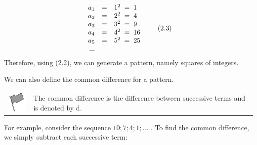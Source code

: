     \begin{equation}
    \begin{array}{ccc}\hfill {a}_{1}& =& {1}^{2}\phantom{\rule{0.277778em}{0ex}}=\phantom{\rule{0.277778em}{0ex}}1\hfill \\ \hfill {a}_{2}& =& {2}^{2}\phantom{\rule{0.277778em}{0ex}}=\phantom{\rule{0.277778em}{0ex}}4\hfill \\ \hfill {a}_{3}& =& {3}^{2}\phantom{\rule{0.277778em}{0ex}}=\phantom{\rule{0.277778em}{0ex}}9\hfill \\ \hfill {a}_{4}& =& {4}^{2}\phantom{\rule{0.277778em}{0ex}}=\phantom{\rule{0.277778em}{0ex}}16\hfill \\ \hfill {a}_{5}& =& {5}^{2}\phantom{\rule{0.277778em}{0ex}}=\phantom{\rule{0.277778em}{0ex}}25\hfill \\ \hfill ...\end{array}\tag{2.3}
      \end{equation}
      \label{m39362*id64323}Therefore, using (2.2), we can generate a pattern, namely squares of integers.\par 
\label{m39362*eip-695}We can also define the common difference for a pattern. \vspace{\rubberspace}\par
        \label{m39362*id743}\begin{definition}
	  \begin{tabular*}{15 cm}{m{15 mm}m{}}
	\hspace*{-50pt}  \includegraphics[width=0.5in]{col11306.imgs/psflag2.png}   & \Definition{   \label{id2472543}\textbf{Common difference}} { \label{m39362*mean743}The common difference is the difference between successive terms and is denoted by d. } 
      \end{tabular*}
      \end{definition}
For example, consider the sequence $10;7;4;1;\mathrm{...}$ . To find the common difference, we simply subtract each successive term:
\label{m39362*id872}\nopagebreak\noindent{}

